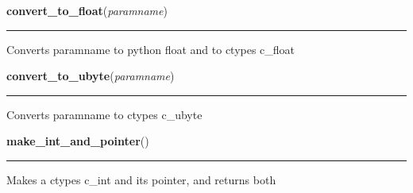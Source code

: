     \label{xformslib:library:convert_to_float}

    \vspace{0.5ex}

\hspace{.8\funcindent}\begin{boxedminipage}{\funcwidth}

    \raggedright \textbf{convert\_to\_float}(\textit{paramname})

    \vspace{-1.5ex}

    \rule{\textwidth}{0.5\fboxrule}
\setlength{\parskip}{2ex}
    Converts paramname to python float and to ctypes c\_float

\setlength{\parskip}{1ex}
    \end{boxedminipage}

    \label{xformslib:library:convert_to_ubyte}

    \vspace{0.5ex}

\hspace{.8\funcindent}\begin{boxedminipage}{\funcwidth}

    \raggedright \textbf{convert\_to\_ubyte}(\textit{paramname})

    \vspace{-1.5ex}

    \rule{\textwidth}{0.5\fboxrule}
\setlength{\parskip}{2ex}
    Converts paramname to ctypes c\_ubyte

\setlength{\parskip}{1ex}
    \end{boxedminipage}

    \label{xformslib:library:make_int_and_pointer}

    \vspace{0.5ex}

\hspace{.8\funcindent}\begin{boxedminipage}{\funcwidth}

    \raggedright \textbf{make\_int\_and\_pointer}()

    \vspace{-1.5ex}

    \rule{\textwidth}{0.5\fboxrule}
\setlength{\parskip}{2ex}
    Makes a ctypes c\_int and its pointer, and returns both

\setlength{\parskip}{1ex}
    \end{boxedminipage}

